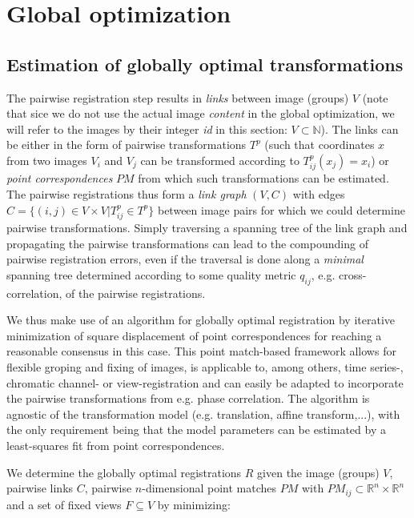 \section{Global optimization}
\label{ssec:globalopt}

\subsection*{Estimation of globally optimal transformations}

The pairwise registration step results in \emph{links} between image (groups) $V$ (note that sice we do not use the actual image \emph{content} in the global optimization, we will refer to the images by their integer \emph{id} in this section: $V \subset \mathbb{N}$). The links can be either in the form of pairwise transformations $T^{p}$  (such that coordinates $x$ from two images $V_i$ and $V_j$ can be transformed according to $T^p_{ij} (x_{j}) = x_i$) or \emph{point correspondences} $PM$ from which such transformations can be estimated.
The pairwise registrations thus form a \emph{link graph} $(V, C)$ with edges $C = \{(i,j) \in V \times V | T^p_{ij} \in T^p \}$ between image pairs for which we could determine pairwise transformations. Simply traversing a spanning tree of the link graph and propagating the pairwise transformations can lead to the compounding of pairwise registration errors, even if the traversal is done along a \emph{minimal} spanning tree determined according to some quality metric $q_{ij}$, e.g. cross-correlation, of the pairwise registrations.

We thus make use of an algorithm for globally optimal registration by iterative minimization of square displacement of point correspondences\cite{saalfeld2010rigid, saalfeld2012elastic} for reaching a reasonable consensus in this case. This point match-based framework allows for flexible groping and fixing of images, is applicable to, among others, time series-, chromatic channel- or view-registration and can easily be adapted to incorporate the pairwise transformations from e.g. phase correlation. The algorithm is agnostic of the transformation model (e.g. translation, affine transform,...), with the only requirement being that the model parameters can be estimated by a least-squares fit from point correspondences.

We determine the globally optimal registrations $R$ given the image (groups) $V$, pairwise links $C$, pairwise $n$-dimensional point matches $PM$ with $PM_{ij} \subset \mathbb{R}^n \times  \mathbb{R}^n$ and a set of fixed views $F \subseteq V$ by minimizing:

